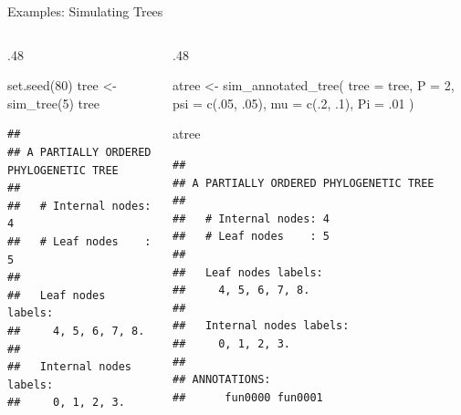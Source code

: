 \documentclass[9pt,handout,ignorenonframetext,]{beamer}
\newenvironment{Shaded}{\begin{snugshade}}{\end{snugshade}}
\newcommand{\KeywordTok}[1]{\textcolor[rgb]{0.94,0.87,0.69}{#1}}
\newcommand{\DataTypeTok}[1]{\textcolor[rgb]{0.87,0.87,0.75}{#1}}
\newcommand{\DecValTok}[1]{\textcolor[rgb]{0.86,0.86,0.80}{#1}}
\newcommand{\StringTok}[1]{\textcolor[rgb]{0.80,0.58,0.58}{#1}}
\newcommand{\NormalTok}[1]{\textcolor[rgb]{0.80,0.80,0.80}{#1}}
\def\begincols{\begin{columns}[T]}
\def\begincol{\begin{column}[T]}
\def\endcol{\end{column}}
\def\endcols{\end{columns}}
\begin{document}
\begin{frame}[fragile,t]{Examples: Simulating Trees}

\begincols

\begincol{.48\textwidth}

\footnotesize

\begin{Shaded}
\begin{Highlighting}[]
\KeywordTok{set.seed}\NormalTok{(}\DecValTok{80}\NormalTok{)}
\NormalTok{tree <-}\StringTok{ }\KeywordTok{sim_tree}\NormalTok{(}\DecValTok{5}\NormalTok{)}
\NormalTok{tree}
\end{Highlighting}
\end{Shaded}

\begin{verbatim}
## 
## A PARTIALLY ORDERED PHYLOGENETIC TREE
## 
##   # Internal nodes: 4
##   # Leaf nodes    : 5
## 
##   Leaf nodes labels: 
##     4, 5, 6, 7, 8.
## 
##   Internal nodes labels:
##     0, 1, 2, 3.
\end{verbatim}

\normalsize

\endcol

\begincol{.48\textwidth}

\footnotesize

\begin{Shaded}
\begin{Highlighting}[]
\NormalTok{atree <-}\StringTok{ }\KeywordTok{sim_annotated_tree}\NormalTok{(}
  \DataTypeTok{tree =}\NormalTok{ tree, }\DataTypeTok{P =} \DecValTok{2}\NormalTok{,}
  \DataTypeTok{psi  =} \KeywordTok{c}\NormalTok{(.}\DecValTok{05}\NormalTok{, .}\DecValTok{05}\NormalTok{),}
  \DataTypeTok{mu   =} \KeywordTok{c}\NormalTok{(.}\DecValTok{2}\NormalTok{, .}\DecValTok{1}\NormalTok{),}
  \DataTypeTok{Pi   =}\NormalTok{ .}\DecValTok{01}
\NormalTok{  )}

\NormalTok{atree}
\end{Highlighting}
\end{Shaded}

\begin{verbatim}
## 
## A PARTIALLY ORDERED PHYLOGENETIC TREE
## 
##   # Internal nodes: 4
##   # Leaf nodes    : 5
## 
##   Leaf nodes labels: 
##     4, 5, 6, 7, 8.
## 
##   Internal nodes labels:
##     0, 1, 2, 3.
## 
## ANNOTATIONS:
##      fun0000 fun0001
\end{verbatim}

\normalsize

\endcol

\endcols

\end{frame}
\end{document}
